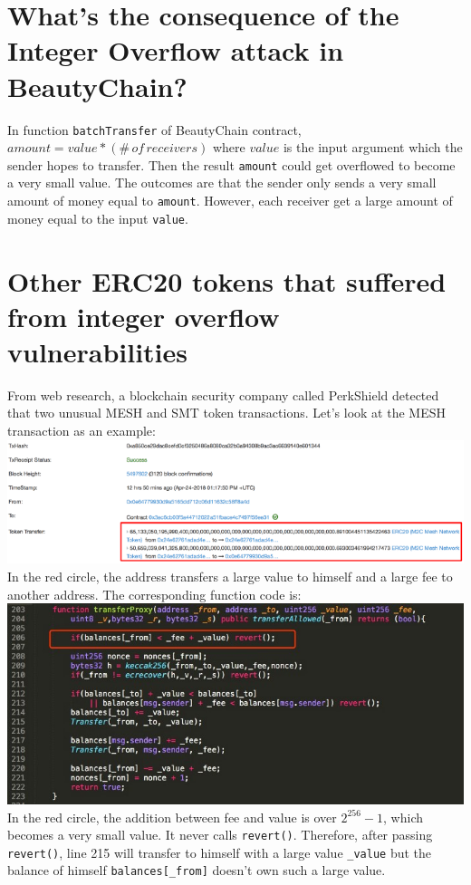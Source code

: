 \documentclass{article}
\begin{document}
\section{What’s the consequence of the Integer Overflow attack in BeautyChain?}
In function \verb|batchTransfer| of BeautyChain contract, $amount = value * (\#\,of\,receivers)$ where $value$ is the input argument which the sender hopes to transfer. Then the result \verb|amount| could get overflowed to become a very small value. The outcomes are that the sender only sends a very small amount of money equal to \verb|amount|. However, each receiver get a large amount of money equal to the input \verb|value|.
\section{Other ERC20 tokens that suffered from integer
overflow vulnerabilities}
From web research, a blockchain security company called PerkShield detected that two unusual MESH and SMT token transactions. Let's look at the MESH transaction as an example:\\
\includegraphics[width=170mm,scale=1]{mesh.png}\\
In the red circle, the address transfers a large value to himself and a large fee to another address.
The corresponding function code is:\\
\includegraphics[width=170mm,scale=1]{meshsc.png}\\
In the red circle, the addition between fee and value is over $2^{256}-1$, which becomes a very small value.
It never calls \verb|revert()|. 
Therefore, after passing \verb|revert()|, line 215 will transfer to himself with a large value \verb|_value| but the balance of himself 
\verb|balances[_from]|
doesn't own such a large value.
\end{document}
